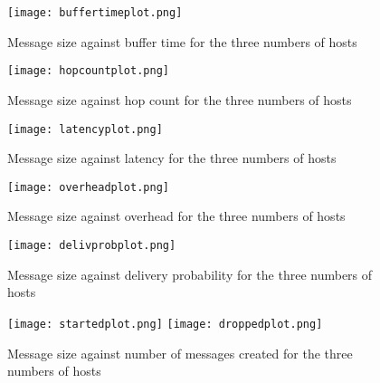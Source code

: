 \documentclass[12pt]{report}
\begin{document}
\begin{figure}[ht]
  \caption{Message size against buffer time for the three numbers of hosts}
  \centering
  \texttt{[image: buffertimeplot.png]}
  \label{fig:buffertime}
\end{figure}

\begin{figure}[ht]
  \caption{Message size against hop count for the three numbers of hosts}
  \centering
  \texttt{[image: hopcountplot.png]}
  \label{fig:hopcount}
\end{figure}

\begin{figure}[ht]
  \caption{Message size against latency for the three numbers of hosts}
  \centering
  \texttt{[image: latencyplot.png]}
  \label{fig:latency}
\end{figure}

\begin{figure}[ht]
  \caption{Message size against overhead for the three numbers of hosts}
  \centering
  \texttt{[image: overheadplot.png]}
  \label{fig:overhead}
\end{figure}

\begin{figure}[ht]
  \caption{Message size against delivery probability for the three numbers of hosts}
  \centering
  \texttt{[image: delivprobplot.png]}
  \label{fig:delivprob}
\end{figure}

\begin{figure}[ht]
  \caption{Message size against number of messages created for the three numbers of hosts}
  \centering
  \texttt{[image: startedplot.png]}
  \texttt{[image: droppedplot.png]}
  \label{fig:startedvsdropped}
\end{figure}

\fi

\end{document}
